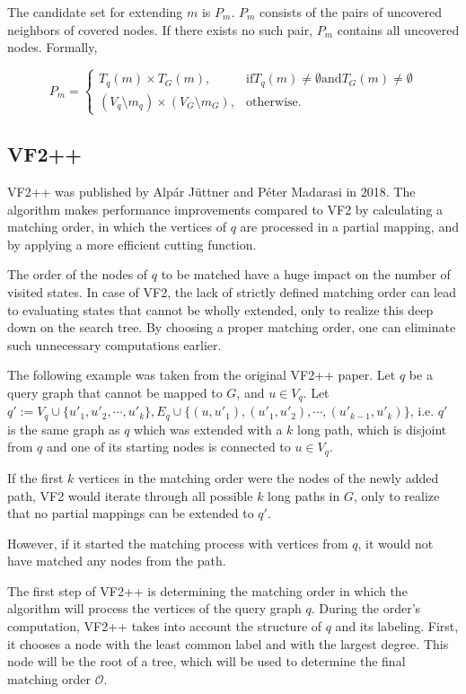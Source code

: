 The candidate set for extending $m$ is $P_m$. $P_m$ consists of the pairs of uncovered neighbors
of covered nodes. If there exists no such pair, $P_m$ contains all uncovered nodes. Formally,

\[
    P_m = 
\begin{cases}
    T_q(m) \times T_G(m),& \text{if} T_q(m) \neq \emptyset \text{and} T_G(m) \neq \emptyset\\
    (V_q \setminus m_q) \times (V_G \setminus m_G),  & \text{otherwise}.
\end{cases}    
\]


\subsection{VF2++}

VF2++ \cite{vf2pp} was published by Alp\'{a}r J\"{u}ttner and P\'{e}ter Madarasi in 2018.
The algorithm makes performance improvements compared to VF2 by calculating a matching
order, in which the vertices of $q$ are processed in a partial mapping, and by applying
a more efficient cutting function.

The order of the nodes of $q$ to be matched have a huge impact on the number of visited
states. In case of VF2, the lack of strictly defined matching order can lead to evaluating
states that cannot be wholly extended, only to realize this deep down on the search tree.
By choosing a proper matching order, one can eliminate such unnecessary computations earlier.

\begin{example}
    The following example was taken from the original VF2++ paper. Let $q$ be a query graph 
    that cannot be mapped to $G$, and $u \in V_q$. Let 
    $q' := V_q \cup \{u'_1, u'_2,\cdots,u'_k\}, E_q \cup \{ (u, u'_1),(u'_1, u'_2),\cdots,(u'_{k-1}, u'_k) \}$,
    i.e. $q'$ is the same graph as $q$ which was extended with a $k$ long path, which is disjoint
    from $q$ and one of its starting nodes is connected to $u \in V_q$.

    If the first $k$ vertices in the matching order were the nodes of the newly added path,
    VF2 would iterate through all possible $k$ long paths in $G$, only to realize that no
    partial mappings can be extended to $q'$.

    However, if it started the matching process with vertices from $q$, it would not have
    matched any nodes from the path.
\end{example}


The first step of VF2++ is determining the matching order in which the algorithm will process
the vertices of the query graph $q$. During the order's computation, VF2++ takes into account
the structure of $q$ and its labeling. First, it chooses a node with the least common label 
and with the largest degree. This node will be the root of a tree, which will be used to determine
the final matching order $\mathcal{O}$.


